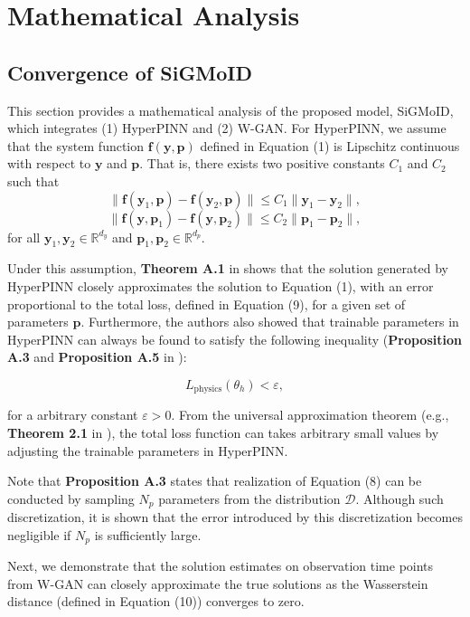 \documentclass[letterpaper]{article} %
\theoremstyle{thmstyleone}%
\theoremstyle{thmstyletwo}%
\theoremstyle{thmstylethree}%
\begin{document}
\section{Mathematical Analysis}\label{math_analysis}
\subsection{Convergence of SiGMoID}
This section provides a mathematical analysis of the proposed model, SiGMoID, which integrates (1) HyperPINN and (2) W-GAN. For HyperPINN, we assume that the system function $\mathbf{f}(\mathbf{y},\mathbf{p})$  defined in Equation (1) is Lipschitz continuous with respect to $\mathbf{y}$ and $\mathbf{p}$. That is, there exists two positive constants $C_1$ and $C_2$ such that
$$\|\mathbf{f}(\mathbf{y}_1,\mathbf{p})-\mathbf{f}(\mathbf{y}_2,\mathbf{p})\|\leq C_{1}\|\mathbf{y}_{1}-\mathbf{y}_2\|,$$
$$\|\mathbf{f}(\mathbf{y},\mathbf{p}_1)-\mathbf{f}(\mathbf{y},\mathbf{p}_2)\|\leq C_{2}\|\mathbf{p}_{1}-\mathbf{p}_2\|,$$
for all $\mathbf{y}_1, \mathbf{y}_2 \in \mathbb{R}^{d_y}$ and  $\mathbf{p}_1, \mathbf{p}_2 \in \mathbb{R}^{d_p}$.

Under this assumption, \textbf{Theorem A.1} in \cite{cho2024estimation} shows that the solution generated by HyperPINN closely approximates the solution to Equation (1), with an error proportional to the total loss, defined in Equation (9), for a given set of parameters $\mathbf{p}$. Furthermore, the authors also showed that trainable parameters in HyperPINN can always be found to satisfy the following inequality (\textbf{Proposition A.3} and \textbf{Proposition A.5} in \cite{cho2024estimation}):

\begin{equation}\nonumber
L_{\text{physics}}(\theta_h)<\varepsilon,
\end{equation}

for a arbitrary constant $\varepsilon>0$. From the universal approximation theorem (e.g., \textbf{Theorem 2.1} in \cite{li1996simultaneous}), the total loss function can takes arbitrary small values by adjusting the trainable parameters in HyperPINN. 

Note that \textbf{Proposition A.3} states that realization of Equation (8) can be conducted by sampling $N_p$ parameters from the distribution $\mathcal{D}$. Although such discretization, it is shown that the error introduced by this discretization becomes negligible if $N_p$ is sufficiently large.

Next, we demonstrate that the solution estimates on observation time points from W-GAN can closely approximate the true solutions as the Wasserstein distance (defined in Equation (10)) converges to zero. %
\end{document}
